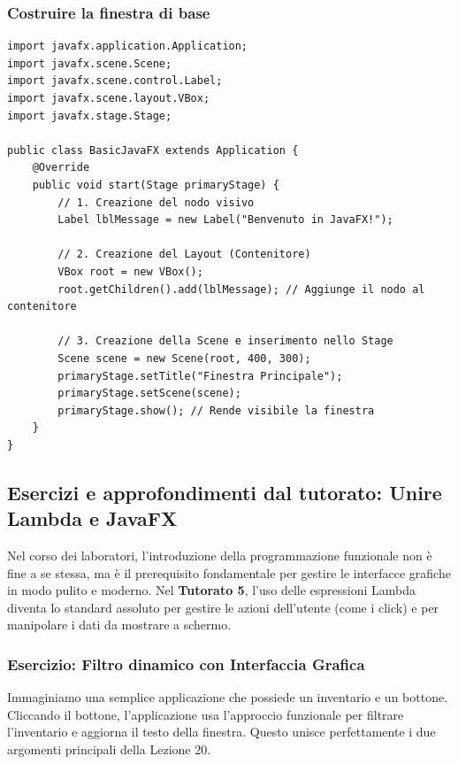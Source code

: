 \documentclass[12pt, a4paper]{article}
\begin{document}
\newpage

\subsubsection{Costruire la finestra di base}
\begin{verbatim}
import javafx.application.Application;
import javafx.scene.Scene;
import javafx.scene.control.Label;
import javafx.scene.layout.VBox;
import javafx.stage.Stage;

public class BasicJavaFX extends Application {
    @Override
    public void start(Stage primaryStage) {
        // 1. Creazione del nodo visivo
        Label lblMessage = new Label("Benvenuto in JavaFX!");

        // 2. Creazione del Layout (Contenitore)
        VBox root = new VBox();
        root.getChildren().add(lblMessage); // Aggiunge il nodo al contenitore

        // 3. Creazione della Scene e inserimento nello Stage
        Scene scene = new Scene(root, 400, 300);
        primaryStage.setTitle("Finestra Principale");
        primaryStage.setScene(scene);
        primaryStage.show(); // Rende visibile la finestra
    }
}
\end{verbatim}

\subsection{Esercizi e approfondimenti dal tutorato: Unire Lambda e JavaFX}
Nel corso dei laboratori, l'introduzione della programmazione funzionale non è fine a se stessa, ma è il prerequisito fondamentale per gestire le interfacce grafiche in modo pulito e moderno. Nel \textbf{Tutorato 5}, l'uso delle espressioni Lambda diventa lo standard assoluto per gestire le azioni dell'utente (come i click) e per manipolare i dati da mostrare a schermo.

\subsubsection{Esercizio: Filtro dinamico con Interfaccia Grafica}
Immaginiamo una semplice applicazione che possiede un inventario e un bottone. Cliccando il bottone, l'applicazione usa l'approccio funzionale per filtrare l'inventario e aggiorna il testo della finestra. Questo unisce perfettamente i due argomenti principali della Lezione 20.
\end{document}
